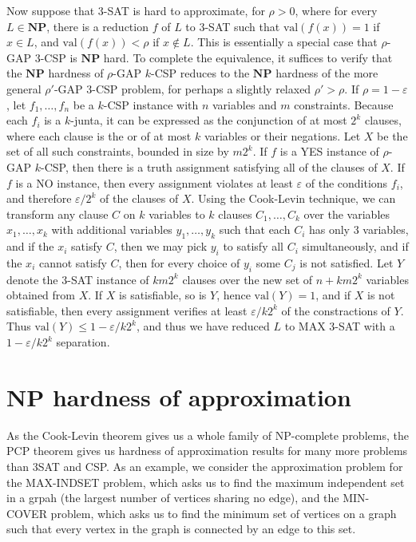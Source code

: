 Now suppose that 3-SAT is hard to approximate, for $\rho > 0$, where for every $L \in \mathbf{NP}$, there is a reduction $f$ of $L$ to 3-SAT such that $\text{val}(f(x)) = 1$ if $x \in L$, and $\text{val}(f(x)) < \rho$ if $x \not \in L$. This is essentially a special case that $\rho$-GAP $3$-CSP is $\mathbf{NP}$ hard. To complete the equivalence, it suffices to verify that the $\mathbf{NP}$ hardness of $\rho$-GAP $k$-CSP reduces to the $\mathbf{NP}$ hardness of the more general $\rho'$-GAP $3$-CSP problem, for perhaps a slightly relaxed $\rho' > \rho$. If $\rho = 1 - \varepsilon$, let $f_1, \dots, f_n$ be a $k$-CSP instance with $n$ variables and $m$ constraints. Because each $f_i$ is a $k$-junta, it can be expressed as the conjunction of at most $2^k$ clauses, where each clause is the or of at most $k$ variables or their negations. Let $X$ be the set of all such constraints, bounded in size by $m2^k$. If $f$ is a YES instance of $\rho$-GAP $k$-CSP, then there is a truth assignment satisfying all of the clauses of $X$. If $f$ is a NO instance, then every assignment violates at least $\varepsilon$ of the conditions $f_i$, and therefore $\varepsilon/2^k$ of the clauses of $X$. Using the Cook-Levin technique, we can transform any clause $C$ on $k$ variables to $k$ clauses $C_1, \dots, C_k$ over the variables $x_1, \dots, x_k$ with additional variables $y_1, \dots, y_k$ such that each $C_i$ has only 3 variables, and if the $x_i$ satisfy $C$, then we may pick $y_i$ to satisfy all $C_i$ simultaneously, and if the $x_i$ cannot satisfy $C$, then for every choice of $y_i$ some $C_j$ is not satisfied. Let $Y$ denote the 3-SAT instance of $km2^k$ clauses over the new set of $n + km2^k$ variables obtained from $X$. If $X$ is satisfiable, so is $Y$, hence $\text{val}(Y) = 1$, and if $X$ is not satisfiable, then every assignment verifies at least $\varepsilon/k2^k$ of the constractions of $Y$. Thus $\text{val}(Y) \leq 1 - \varepsilon/k2^k$, and thus we have reduced $L$ to MAX 3-SAT with a $1-\varepsilon/k2^k$ separation.

\section{$\mathbf{NP}$ hardness of approximation}

As the Cook-Levin theorem gives us a whole family of NP-complete problems, the PCP theorem gives us hardness of approximation results for many more problems than 3SAT and CSP. As an example, we consider the approximation problem for the MAX-INDSET problem, which asks us to find the maximum independent set in a grpah (the largest number of vertices sharing no edge), and the MIN-COVER problem, which asks us to find the minimum set of vertices on a graph such that every vertex in the graph is connected by an edge to this set.


